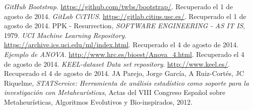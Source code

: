\begin{thebibliography}{99}
 \textit{GitHub Bootstrap}. \url{https://github.com/twbs/bootstrap/}. Recuperado el 1 de agosto de 2014.
 \textit{GitLab CiTIUS}. \url{https://gitlab.citius.usc.es/}. Recuperado el 1 de agosto de 2014.
 PPK - Resurrection, \textit{SOFTWARE ENGINEERING - AS IT IS}, 1979.
 \textit{UCI Machine Learning Repository}. \url{https://archive.ics.uci.edu/ml/index.html}. Recuperado el 4 de agosto de 2014.
 \textit{Ejemplo de ANOVA}. \url{http://www.hrc.es/bioest/Anova_4.html}. Recuperado el 4 de agosto de 2014.
 \textit{KEEL-dataset Data set repository}. \url{http://www.keel.es/}. Recuperado el 4 de agosto de 2014.
 JA Parejo, Jorge García, A Ruiz-Cortés, JC Riquelme, \textit{STATService: Herramienta de análisis estadístico como soporte para la investigación con Metaheurísticas}, Actas del VIII Congreso Español sobre Metaheurísticas, Algoritmos Evolutivos y Bio-inspirados, 2012.
\end{thebibliography}